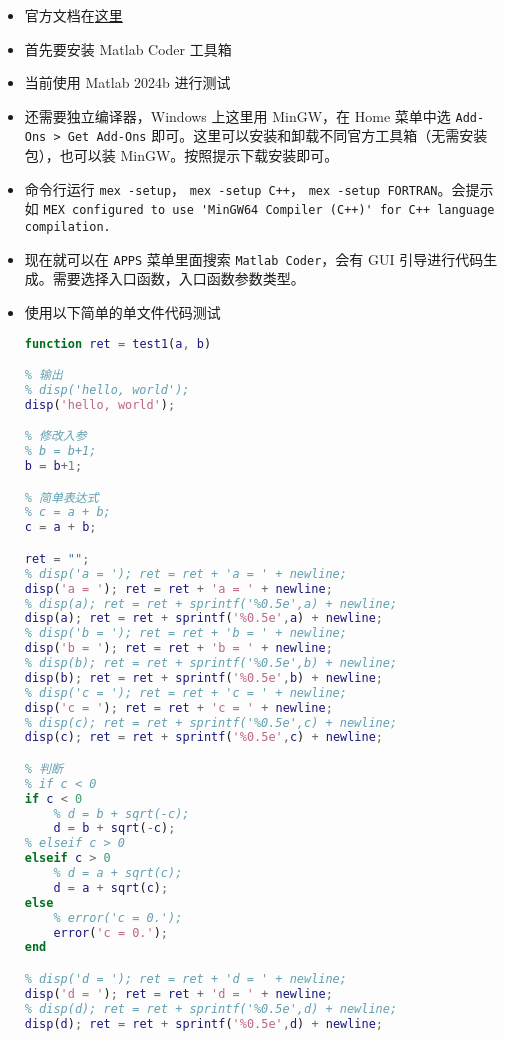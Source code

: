 
\begin{itemize}
\item 官方文档在\href{https://ch.mathworks.com/help/coder/index.html?s_tid=CRUX_lftnav}{这里}
\item 首先要安装 Matlab Coder 工具箱
\item 当前使用 Matlab 2024b 进行测试
\item 还需要独立编译器，Windows 上这里用 MinGW，在 Home 菜单中选 \verb`Add-Ons > Get Add-Ons` 即可。这里可以安装和卸载不同官方工具箱（无需安装包），也可以装 MinGW。按照提示下载安装即可。
\item 命令行运行 \verb`mex -setup`， \verb`mex -setup C++`， \verb`mex -setup FORTRAN`。会提示如 \verb`MEX configured to use 'MinGW64 Compiler (C++)' for C++ language compilation.`
\item 现在就可以在 \verb`APPS` 菜单里面搜索 \verb`Matlab Coder`，会有 GUI 引导进行代码生成。需要选择入口函数，入口函数参数类型。
\item 使用以下简单的单文件代码测试
\begin{lstlisting}[language=matlab,caption=test1.m]
% 代码生成的入口函数，arg* 限制为字符串，ret 限制为非负整数
function ret = test1(a, b)

% 输出
% disp('hello, world');
disp('hello, world');

% 修改入参
% b = b+1;
b = b+1;

% 简单表达式
% c = a + b;
c = a + b;

ret = "";
% disp('a = '); ret = ret + 'a = ' + newline;
disp('a = '); ret = ret + 'a = ' + newline;
% disp(a); ret = ret + sprintf('%0.5e',a) + newline;
disp(a); ret = ret + sprintf('%0.5e',a) + newline;
% disp('b = '); ret = ret + 'b = ' + newline;
disp('b = '); ret = ret + 'b = ' + newline;
% disp(b); ret = ret + sprintf('%0.5e',b) + newline;
disp(b); ret = ret + sprintf('%0.5e',b) + newline;
% disp('c = '); ret = ret + 'c = ' + newline;
disp('c = '); ret = ret + 'c = ' + newline;
% disp(c); ret = ret + sprintf('%0.5e',c) + newline;
disp(c); ret = ret + sprintf('%0.5e',c) + newline;

% 判断
% if c < 0
if c < 0
    % d = b + sqrt(-c);
    d = b + sqrt(-c);
% elseif c > 0
elseif c > 0
    % d = a + sqrt(c);
    d = a + sqrt(c);
else
    % error('c = 0.');
    error('c = 0.');
end

% disp('d = '); ret = ret + 'd = ' + newline;
disp('d = '); ret = ret + 'd = ' + newline;
% disp(d); ret = ret + sprintf('%0.5e',d) + newline;
disp(d); ret = ret + sprintf('%0.5e',d) + newline;


\end{lstlisting}
\end{itemize}
